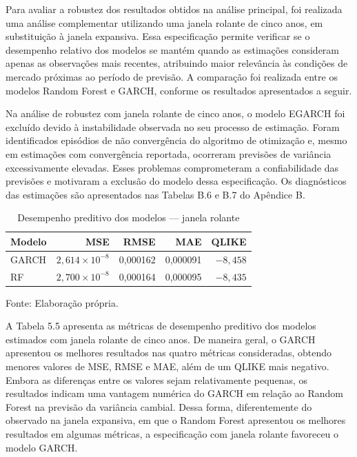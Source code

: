 Para avaliar a robustez dos resultados obtidos na análise principal, foi realizada uma análise complementar utilizando uma janela rolante de cinco anos, em 
substituição à janela expansiva. Essa especificação permite verificar se o desempenho relativo dos modelos se mantém quando as estimações consideram apenas 
as observações mais recentes, atribuindo maior relevância às condições de mercado próximas ao período de previsão. A comparação foi realizada entre os modelos 
Random Forest e GARCH, conforme os resultados apresentados a seguir.

Na análise de robustez com janela rolante de cinco anos, o modelo EGARCH foi excluído devido à instabilidade observada no seu processo de estimação. Foram 
identificados episódios de não convergência do algoritmo de otimização e, mesmo em estimações com convergência reportada, ocorreram previsões de variância 
excessivamente elevadas. Esses problemas comprometeram a confiabilidade das previsões e motivaram a exclusão do modelo dessa especificação. Os diagnósticos 
das estimações são apresentados nas Tabelas B.6 e B.7 do Apêndice B.

\begin{table}[htbp]
    \centering
    \caption{Desempenho preditivo dos modelos — janela rolante}
    \label{tab:metricas_rolante}
    \begin{tabular}{lrrrr}
        \toprule
        Modelo & MSE & RMSE & MAE & QLIKE \\
        \midrule
        GARCH & $2{,}614 \times 10^{-8}$ & 0,000162 & 0,000091 & $-8{,}458$ \\
        RF    & $2{,}700 \times 10^{-8}$ & 0,000164 & 0,000095 & $-8{,}435$ \\
        \bottomrule
    \end{tabular}

    \vspace{0.2cm}
    \footnotesize Fonte: Elaboração própria.
\end{table}

A Tabela 5.5 apresenta as métricas de desempenho preditivo dos modelos estimados com janela rolante de cinco anos. De maneira geral, o GARCH apresentou 
os melhores resultados nas quatro métricas consideradas, obtendo menores valores de MSE, RMSE e MAE, além de um QLIKE mais negativo. Embora as diferenças entre 
os valores sejam relativamente pequenas, os resultados indicam uma vantagem numérica do GARCH em relação ao Random Forest na previsão da variância cambial.
Dessa forma, diferentemente do observado na janela expansiva, em que o Random Forest apresentou os melhores resultados em algumas métricas, a especificação 
com janela rolante favoreceu o modelo GARCH.


